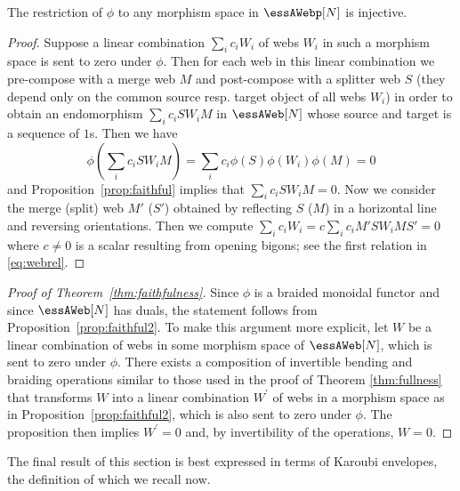 \begin{prop}\label{prop:faithful2} The restriction of $\phi$ to any morphism space in $\essAWebp[N]$ is injective.
\end{prop}
\begin{proof}
Suppose a linear combination $\sum_i c_i W_i$ of webs $W_i$ in such a morphism
space is sent to zero under $\phi$. Then for each web in this linear
combination we pre-compose with a merge web $M$ and post-compose with a splitter
web $S$ (they depend only on the common source resp. target object of all webs
$W_i$) in order to obtain an endomorphism $\sum_i c_i S W_i M$ in $\essAWeb[N]$
whose source and target is a sequence of $1$s. Then we have $$\phi(\sum_i c_i S
W_i M)= \sum_i c_i \phi(S)\phi(W_i)\phi(M)=0$$ and
Proposition~\ref{prop:faithful} implies that $\sum_i c_i S W_i M=0$. Now we
consider the merge (split) web $M'$ ($S'$) obtained by reflecting $S$ ($M$) in a
horizontal line and reversing orientations. Then we compute $\sum_i c_i W_i= c
\sum_i c_i M' S W_i M S' = 0$ where $c\neq 0$ is a scalar resulting from opening
bigons; see the first relation in \eqref{eq:webrel}. 
\end{proof}

\begin{proof}[Proof of Theorem~\ref{thm:faithfulness}]
Since $\phi$ is a braided monoidal functor and since $\essAWeb[N]$ has duals,
the statement follows from Proposition~\ref{prop:faithful2}. To make this
argument more explicit, let $W$ be a linear combination of webs in some morphism
space of $\essAWeb[N]$, which is sent to zero under $\phi$. There exists a
composition of invertible bending and braiding operations similar to those used
in the proof of Theorem \ref{thm:fullness} that transforms $W$ into a linear
combination $W^\prime$ of webs in a morphism space as in
Proposition~\ref{prop:faithful2}, which is also sent to zero under $\phi$. The
proposition then implies $W^\prime=0$ and, by invertibility of the operations,
$W=0$.
\end{proof}


The final result of this section is best expressed in terms of Karoubi
envelopes, the definition of which we recall now.

